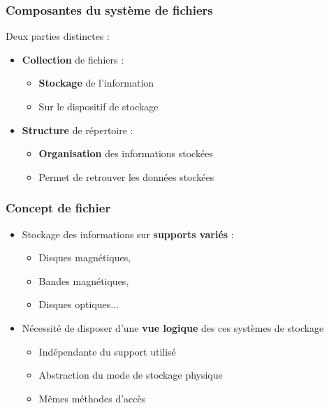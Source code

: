 \begin{frame}
\frametitle{Composantes du système de fichiers}
Deux parties distinctes :
\begin{itemize}
\item \textbf{Collection} de fichiers :
\begin{itemize}
\item \textbf{Stockage} de l'information
\item Sur le dispositif de stockage
\end{itemize}
\item \textbf{Structure} de répertoire : 
\begin{itemize}
\item \textbf{Organisation} des informations stockées
\item Permet de retrouver les données stockées
\end{itemize}
\end{itemize}
\end{frame}


\begin{frame}
\frametitle{Concept de fichier}
\begin{itemize}
\item Stockage des informations sur \textbf{supports variés} :
\begin{itemize}
\item Disques magnétiques,
\item Bandes magnétiques,
\item Disques optiques...
\end{itemize}
\item Nécessité de disposer d'une \textbf{vue logique} des ces systèmes de stockage
\begin{itemize}
\item Indépendante du support utilisé
\item Abstraction du mode de stockage physique
\item Mêmes méthodes d'accès
\end{itemize}
\end{itemize}
\end{frame}

